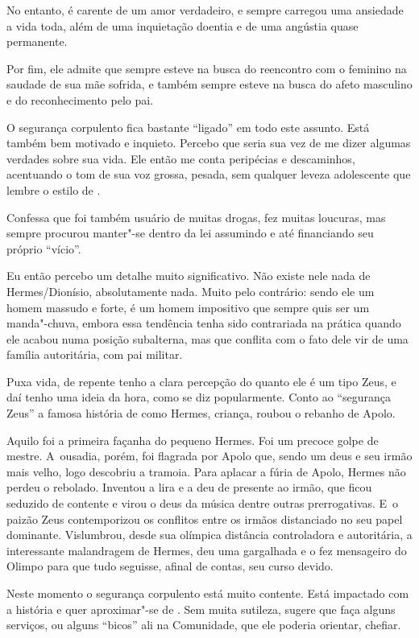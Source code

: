 No entanto,  é carente de um amor verdadeiro, e sempre carregou uma
ansiedade a vida toda, além de uma inquietação doentia e de uma angústia
quase permanente.

Por fim, ele admite que sempre esteve na busca do reencontro com o
feminino na saudade de sua mãe sofrida, e também sempre esteve na busca
do afeto masculino e do reconhecimento pelo pai.

\asterisc{}

O segurança corpulento fica bastante ``ligado'' em todo este assunto.
Está também bem motivado e inquieto. Percebo que seria sua vez de me
dizer algumas verdades sobre sua vida. Ele então me conta peripécias e
descaminhos, acentuando o tom de sua voz grossa, pesada, sem qualquer
leveza adolescente que lembre o estilo de .

Confessa que foi também usuário de muitas drogas, fez muitas loucuras,
mas sempre procurou manter"-se dentro da lei assumindo e até financiando
seu próprio ``vício''.

Eu então percebo um detalhe muito significativo. Não existe nele nada de
Hermes/Dionísio, absolutamente nada. Muito pelo contrário: sendo ele um
homem massudo e forte, é um homem impositivo que sempre quis ser um
manda"-chuva, embora essa tendência tenha sido contrariada na prática
quando ele acabou numa posição subalterna, mas que conflita com o fato
dele vir de uma família autoritária, com pai militar.

Puxa vida, de repente tenho a clara percepção do quanto ele é um tipo
Zeus, e daí tenho uma ideia da hora, como se diz popularmente. Conto ao
``segurança Zeus'' a famosa história de como Hermes, criança, roubou o
rebanho de Apolo.

Aquilo foi a primeira façanha do pequeno Hermes. Foi um precoce golpe de
mestre. A~ousadia, porém, foi flagrada por Apolo que, sendo um deus e
seu irmão mais velho, logo descobriu a tramoia. Para aplacar a fúria de
Apolo, Hermes não perdeu o rebolado. Inventou a lira e a deu de presente
ao irmão, que ficou seduzido de contente e virou o deus da música dentre
outras prerrogativas. E~o paizão Zeus contemporizou os conflitos entre
os irmãos distanciado no seu papel dominante. Vislumbrou, desde sua
olímpica distância controladora e autoritária, a interessante
malandragem de Hermes, deu uma gargalhada e o fez mensageiro do Olimpo
para que tudo seguisse, afinal de contas, seu curso devido.

Neste momento o segurança corpulento está muito contente. Está impactado
com a história e quer aproximar"-se de . Sem muita sutileza, sugere que
 faça alguns serviços, ou alguns ``bicos'' ali na Comunidade, que ele
poderia orientar, chefiar.


